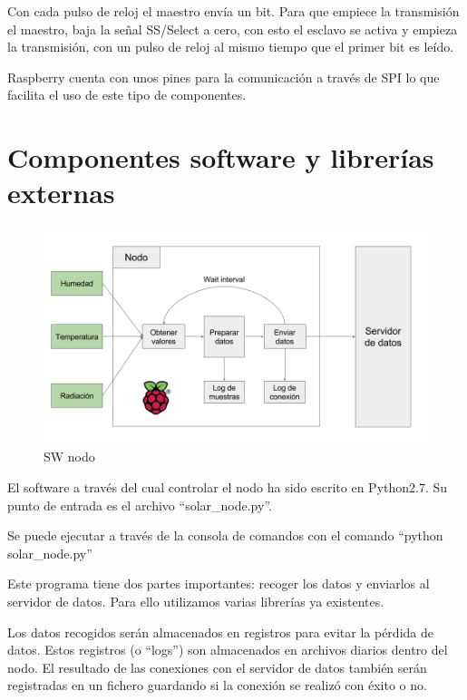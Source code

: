 Con cada pulso de reloj el maestro envía un bit. Para que empiece la transmisión el maestro, baja la señal SS/Select a cero, con esto el esclavo se activa y empieza la transmisión, con un pulso de reloj al mismo tiempo que el primer bit es leído.

Raspberry cuenta con unos pines para la comunicación a través de SPI lo que facilita el uso de este tipo de componentes.

\section{Componentes software y librerías externas}
\label{makereference3.4}

\begin{figure}[htb]
	\begin{center}
		\includegraphics[width=15cm]{figures/diagrama_nodo.png}
		\caption{SW nodo \label{diagrama_sw_nodo}}
	\end{center}
\end{figure}

El software a través del cual controlar el nodo ha sido escrito en Python2.7. Su punto de entrada es el archivo ``solar\_node.py''.

Se puede ejecutar a través de la consola de comandos con el comando ``python solar\_node.py''

Este programa tiene dos partes importantes: recoger los datos y enviarlos al servidor de datos. Para ello utilizamos varias librerías ya existentes.

Los datos recogidos serán almacenados en registros para evitar la pérdida de datos. Estos registros (o ``logs'') son almacenados en archivos diarios dentro del nodo. El resultado de las conexiones con el servidor de datos también serán registradas en un fichero guardando si la conexión se realizó con éxito o no.

